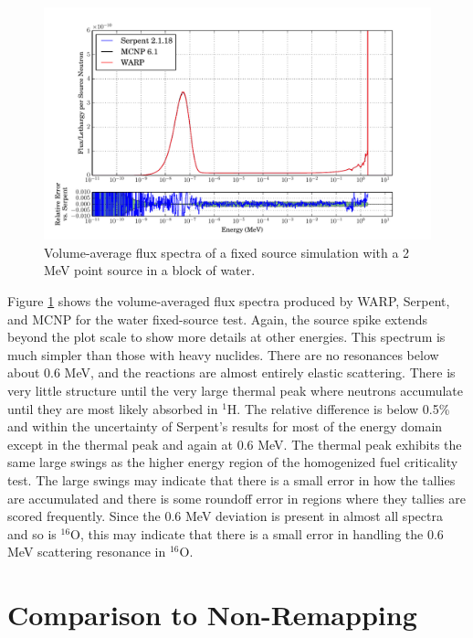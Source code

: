 \begin{figure}[h!]
\centering
\includegraphics[width=\textwidth,trim= 1cm 0cm 1cm 0cm]{graphics/finalresults/fixed_spec_water.pdf}
\caption{Volume-average flux spectra of a fixed source simulation with a 2 MeV point source in a block of water. \label{fixed_spec_water} }
\end{figure}

Figure \ref{fixed_spec_water} shows the volume-averaged flux spectra produced by WARP, Serpent, and MCNP for the water fixed-source test.  Again, the source spike extends beyond the plot scale to show more details at other energies.  This spectrum is much simpler than those with heavy nuclides.  There are no resonances below about 0.6 MeV, and the reactions are almost entirely elastic scattering.  There is very little structure until the very large thermal peak where neutrons accumulate until they are most likely absorbed in $^1$H.  The relative difference is below 0.5\% and within the uncertainty of Serpent's results for most of the energy domain except in the thermal peak and again at 0.6 MeV.  The thermal peak exhibits the same large swings as the higher energy region of the homogenized fuel criticality test.  The large swings may indicate that there is a small error in how the tallies are accumulated and there is some roundoff error in regions where they tallies are scored frequently.   Since the 0.6 MeV deviation is present in almost all spectra and so is $^{16}$O, this may indicate that there is a small error in handling the 0.6 MeV scattering resonance in $^{16}$O.  


\section{Comparison to Non-Remapping}

